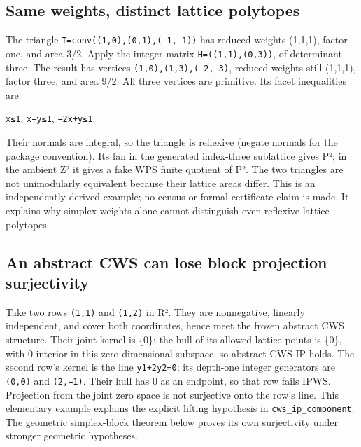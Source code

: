 \documentclass[11pt,a4paper,oneside]{report}
\begin{document}
\subsection{Same weights, distinct lattice
polytopes}\label{weight-systems-and-wps--same-weights-distinct-lattice-polytopes}

The triangle
\texttt{T=\allowbreak{}conv(\allowbreak{}(\allowbreak{}1,\allowbreak{}0)\allowbreak{},\allowbreak{}(\allowbreak{}0,\allowbreak{}1)\allowbreak{},\allowbreak{}(\allowbreak{}-\allowbreak{}1,\allowbreak{}-\allowbreak{}1)\allowbreak{})}
has reduced weights (1,1,1), factor one, and area 3/2. Apply the integer
matrix
\texttt{H=\allowbreak{}(\allowbreak{}(\allowbreak{}1,\allowbreak{}1)\allowbreak{},\allowbreak{}(\allowbreak{}0,\allowbreak{}3)\allowbreak{})},
of determinant three. The result has vertices
\texttt{(\allowbreak{}1,\allowbreak{}0)\allowbreak{},\allowbreak{}(\allowbreak{}1,\allowbreak{}3)\allowbreak{},\allowbreak{}(\allowbreak{}-\allowbreak{}2,\allowbreak{}-\allowbreak{}3)},
reduced weights still (1,1,1), factor three, and area 9/2. All three
vertices are primitive. Its facet inequalities are

\texttt{x≤1}, \texttt{x−y≤1}, \texttt{−2x+y≤1}.

Their normals are integral, so the triangle is reflexive (negate normals
for the package convention). Its fan in the generated index-three
sublattice gives P²; in the ambient Z² it gives a fake WPS finite
quotient of P². The two triangles are not unimodularly equivalent
because their lattice areas differ. This is an independently derived
example; no census or formal-certificate claim is made. It explains why
simplex weights alone cannot distinguish even reflexive lattice
polytopes.

\subsection{An abstract CWS can lose block projection
surjectivity}\label{weight-systems-and-wps--an-abstract-cws-can-lose-block-projection-surjectivity}

Take two rows \texttt{(\allowbreak{}1,\allowbreak{}1)} and
\texttt{(\allowbreak{}1,\allowbreak{}2)} in R². They are nonnegative,
linearly independent, and cover both coordinates, hence meet the frozen
abstract CWS structure. Their joint kernel is \{0\}; the hull of its
allowed lattice points is \{0\}, with 0 interior in this
zero-dimensional subspace, so abstract CWS IP holds. The second row's
kernel is the line \texttt{y1+2y2=\allowbreak{}0}; its depth-one integer
generators are \texttt{(\allowbreak{}0,\allowbreak{}0)} and
\texttt{(\allowbreak{}2,\allowbreak{}−1)}. Their hull has 0 as an
endpoint, so that row fails IPWS. Projection from the joint zero space
is not surjective onto the row's line. This elementary example explains
the explicit lifting hypothesis in
\texttt{cws\_\allowbreak{}ip\_\allowbreak{}componen\allowbreak{}t}. The
geometric simplex-block theorem below proves its own surjectivity under
stronger geometric hypotheses.
\end{document}
